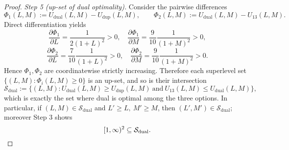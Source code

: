 \begin{proof}
\emph{Step 5 (up-set of dual optimality).} Consider the pairwise differences
\[
\Phi_1(L,M):=U_{\mathrm{dual}}(L,M)-U_{\mathrm{dup}}(L,M),\qquad \Phi_2(L,M):=U_{\mathrm{dual}}(L,M)-U_{13}(L,M).
\]
Direct differentiation yields
\[
\frac{\partial\Phi_1}{\partial L}=\frac{1}{2(1+L)^2}>0,\quad \frac{\partial\Phi_1}{\partial M}=\frac{9}{10}\frac{1}{(1+M)^2}>0,
\]
\[
\frac{\partial\Phi_2}{\partial L}=\frac{7}{10}\frac{1}{(1+L)^2}>0,\quad \frac{\partial\Phi_2}{\partial M}=\frac{9}{10}\frac{1}{(1+M)^2}>0.
\]
Hence $\Phi_1,\Phi_2$ are coordinatewise strictly increasing. Therefore each superlevel set $\{(L,M):\Phi_i(L,M)\ge 0\}$ is an up-set, and so is their intersection
\[
\mathcal{S}_{\mathrm{dual}}:=\{(L,M):U_{\mathrm{dual}}(L,M)\ge U_{\mathrm{dup}}(L,M)\ \text{and}\ U_{13}(L,M)\le U_{\mathrm{dual}}(L,M)\},
\]
which is exactly the set where dual is optimal among the three options. In particular, if $(L,M)\in\mathcal{S}_{\mathrm{dual}}$ and $L'\ge L,\ M'\ge M$, then $(L',M')\in\mathcal{S}_{\mathrm{dual}}$; moreover Step 3 shows
\[
[1,\infty)^2\subseteq\mathcal{S}_{\mathrm{dual}}.\qedhere
\]
\end{proof}
